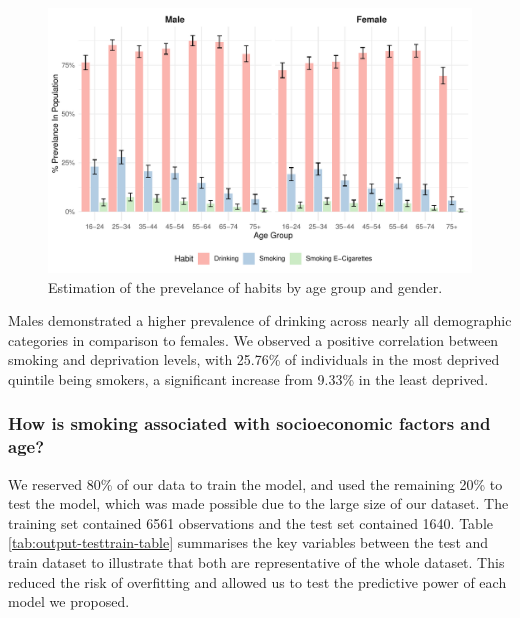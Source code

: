 \documentclass[
  11pt,
  twocolumn]{article}
\begin{document}
\begin{figure}[H]
\includegraphics{Coursework_files/figure-latex/output-prevelance-plot-1} \caption{Estimation of the prevelance of habits by age group and gender.}\label{fig:output-prevelance-plot}
\end{figure}

Males demonstrated a higher prevalence of drinking across nearly all
demographic categories in comparison to females. We observed a positive
correlation between smoking and deprivation levels, with 25.76\% of
individuals in the most deprived quintile being smokers, a significant
increase from 9.33\% in the least deprived.

\hypertarget{how-is-smoking-associated-with-socioeconomic-factors-and-age}{%
\subsubsection{How is smoking associated with socioeconomic factors and
age?}\label{how-is-smoking-associated-with-socioeconomic-factors-and-age}}

We reserved 80\% of our data to train the model, and used the remaining
20\% to test the model, which was made possible due to the large size of
our dataset. The training set contained 6561 observations and the test
set contained 1640. Table \ref{tab:output-testtrain-table} summarises
the key variables between the test and train dataset to illustrate that
both are representative of the whole dataset. This reduced the risk of
overfitting and allowed us to test the predictive power of each model we
proposed.
\end{document}
